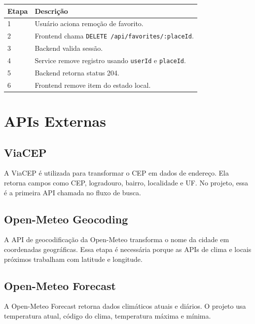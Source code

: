 \documentclass[
    12pt,
    oneside,
    openright,
    a4paper,
    english,
    brazil
]{abntex2}
\begin{document}
\begin{longtable}{|p{2cm}|p{12cm}|}
\hline
\textbf{Etapa} & \textbf{Descrição} \\
\hline
1 & Usuário aciona remoção de favorito. \\
\hline
2 & Frontend chama \texttt{DELETE /api/favorites/:placeId}. \\
\hline
3 & Backend valida sessão. \\
\hline
4 & Service remove registro usando \texttt{userId} e \texttt{placeId}. \\
\hline
5 & Backend retorna status 204. \\
\hline
6 & Frontend remove item do estado local. \\
\hline
\end{longtable}


\chapter{APIs Externas}

\section{ViaCEP}

A ViaCEP é utilizada para transformar o CEP em dados de endereço. Ela retorna campos como CEP, logradouro, bairro, localidade e UF. No projeto, essa é a primeira API chamada no fluxo de busca.

\section{Open-Meteo Geocoding}

A API de geocodificação da Open-Meteo transforma o nome da cidade em coordenadas geográficas. Essa etapa é necessária porque as APIs de clima e locais próximos trabalham com latitude e longitude.

\section{Open-Meteo Forecast}

A Open-Meteo Forecast retorna dados climáticos atuais e diários. O projeto usa temperatura atual, código do clima, temperatura máxima e mínima.
\end{document}
